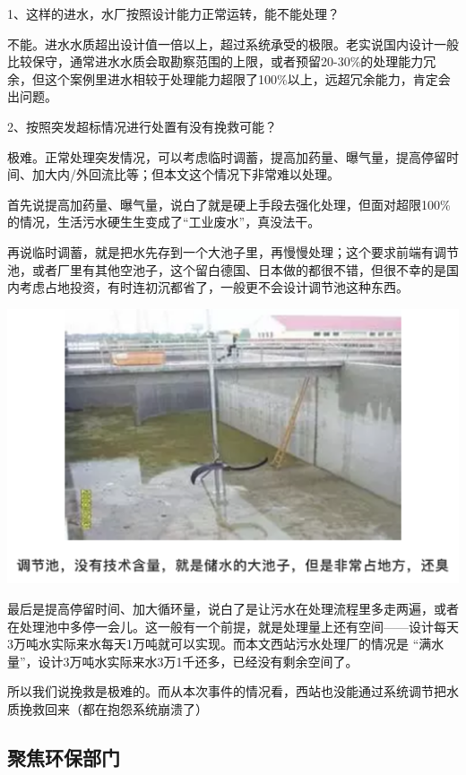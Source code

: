 \documentclass[
]{book}
\begin{document}
1、这样的进水，水厂按照设计能力正常运转，能不能处理？

不能。进水水质超出设计值一倍以上，超过系统承受的极限。老实说国内设计一般比较保守，通常进水水质会取勘察范围的上限，或者预留20-30\%的处理能力冗余，但这个案例里进水相较于处理能力超限了100\%以上，远超冗余能力，肯定会出问题。

2、按照突发超标情况进行处置有没有挽救可能？

极难。正常处理突发情况，可以考虑临时调蓄，提高加药量、曝气量，提高停留时间、加大内/外回流比等；但本文这个情况下非常难以处理。

首先说提高加药量、曝气量，说白了就是硬上手段去强化处理，但面对超限100\%的情况，生活污水硬生生变成了``工业废水''，真没法干。

再说临时调蓄，就是把水先存到一个大池子里，再慢慢处理；这个要求前端有调节池，或者厂里有其他空池子，这个留白德国、日本做的都很不错，但很不幸的是国内考虑占地投资，有时连初沉都省了，一般更不会设计调节池这种东西。

\includegraphics[width=6.67in]{images/py1}

最后是提高停留时间、加大循环量，说白了是让污水在处理流程里多走两遍，或者在处理池中多停一会儿。这一般有一个前提，就是处理量上还有空间------设计每天3万吨水实际来水每天1万吨就可以实现。而本文西站污水处理厂的情况是 ``满水量''，设计3万吨水实际来水3万1千还多，已经没有剩余空间了。

所以我们说挽救是极难的。而从本次事件的情况看，西站也没能通过系统调节把水质挽救回来（都在抱怨系统崩溃了）

\hypertarget{ux805aux7126ux73afux4fddux90e8ux95e8}{%
\subsection{聚焦环保部门}\label{ux805aux7126ux73afux4fddux90e8ux95e8}}
\end{document}
